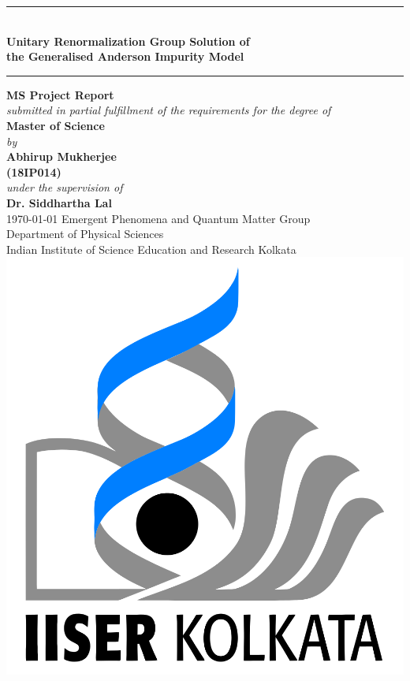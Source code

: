 \begin{titlepage}
	\centering
	\rule{\textwidth}{3pt}\\
	\vspace*{20pt}
	{
		\textbf{\LARGE Unitary Renormalization Group Solution of}\\[10pt]
		\textbf{\LARGE the Generalised Anderson Impurity Model}\\[10pt]
	}
	\rule{\textwidth}{3pt} %
	\vfill
	{\Large \textbf{MS Project Report}}\\
	\vfill
	\textit{\large{ submitted in partial fulfillment of the requirements for the degree of }}\\
	\vfill
	{\Large \textbf{Master of Science\\}}
	\vfill
	\textit{\large by \\}
	\vfill
	{\Large \textbf{Abhirup Mukherjee \\}
	\vspace*{5pt}
	\textbf{(18IP014)\\}
	\vfill
	\textit{\large under the supervision of \\}
	\vfill
	{\Large \textbf{Dr. Siddhartha Lal}\\
	\vfill
	\today
	\vfill
	Emergent Phenomena and Quantum Matter Group\\
	\vspace{0.01\textheight}
	Department of Physical Sciences\\
	\vspace{0.01\textheight}
	Indian Institute of Science Education and Research Kolkata\\}}
	\vfill
	\includegraphics[scale=0.15]{../figures/logo.png}\\
\end{titlepage}
